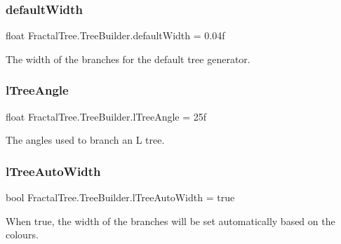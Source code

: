 \subsubsection{\texorpdfstring{default\+Width}{defaultWidth}}
{\footnotesize\ttfamily float Fractal\+Tree.\+Tree\+Builder.\+default\+Width = 0.\+04f}



The width of the branches for the default tree generator. 

\hypertarget{class_fractal_tree_1_1_tree_builder_a10a0d2b7b57b98c4232ba414cdfa8436}{}\label{class_fractal_tree_1_1_tree_builder_a10a0d2b7b57b98c4232ba414cdfa8436} 
\subsubsection{\texorpdfstring{l\+Tree\+Angle}{lTreeAngle}}
{\footnotesize\ttfamily float Fractal\+Tree.\+Tree\+Builder.\+l\+Tree\+Angle = 25f}



The angles used to branch an L tree. 

\hypertarget{class_fractal_tree_1_1_tree_builder_acc1a7487b339290c552ef136fec40b02}{}\label{class_fractal_tree_1_1_tree_builder_acc1a7487b339290c552ef136fec40b02} 
\subsubsection{\texorpdfstring{l\+Tree\+Auto\+Width}{lTreeAutoWidth}}
{\footnotesize\ttfamily bool Fractal\+Tree.\+Tree\+Builder.\+l\+Tree\+Auto\+Width = true}



When true, the width of the branches will be set automatically based on the colours. 

\hypertarget{class_fractal_tree_1_1_tree_builder_a0ed6efbc756277236c9b209ebcba829a}{}\label{class_fractal_tree_1_1_tree_builder_a0ed6efbc756277236c9b209ebcba829a} 

